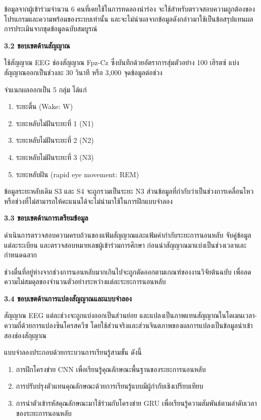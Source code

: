 \documentclass[12pt,a4paper]{article}
\newcommand{\subsectionthai}[1]{%
  \par\vspace{0.35\baselineskip}%
  \noindent\textbf{#1}\par\nobreak\vspace{0.1\baselineskip}%
}
\begin{document}
ข้อมูลจากผู้เข้าร่วมจำนวน 6 คนที่เคยใช้ในการทดลองนำร่อง จะใช้สำหรับตรวจสอบความถูกต้องของโปรแกรมและความพร้อมของระบบเท่านั้น และจะไม่นำผลจากข้อมูลดังกล่าวมาใช้เป็นข้อสรุปแทนผลการประเมินจากชุดข้อมูลฉบับสมบูรณ์

\subsectionthai{3.2 ขอบเขตด้านสัญญาณ}

ใช้สัญญาณ EEG ช่องสัญญาณ Fpz-Cz ซึ่งบันทึกด้วยอัตราการสุ่มตัวอย่าง 100 เฮิรตซ์ แบ่งสัญญาณออกเป็นช่วงละ 30 วินาที หรือ 3,000 จุดข้อมูลต่อช่วง

จำแนกผลออกเป็น 5 กลุ่ม ได้แก่

\begin{enumerate}[label=\arabic*.]
  \item ระยะตื่น (Wake: W)
  \item ระยะหลับไม่ฝันระยะที่ 1 (N1)
  \item ระยะหลับไม่ฝันระยะที่ 2 (N2)
  \item ระยะหลับไม่ฝันระยะที่ 3 (N3)
  \item ระยะหลับฝัน (rapid eye movement: REM)
\end{enumerate}

ข้อมูลระยะหลับเดิม S3 และ S4 จะถูกรวมเป็นระยะ N3 ส่วนข้อมูลที่กำกับว่าเป็นช่วงการเคลื่อนไหวหรือช่วงที่ไม่สามารถให้คะแนนได้จะไม่นำมาใช้ในการฝึกแบบจำลอง

\subsectionthai{3.3 ขอบเขตด้านการเตรียมข้อมูล}

ดำเนินการตรวจสอบความครบถ้วนของแฟ้มสัญญาณและแฟ้มคำกำกับระยะการนอนหลับ จับคู่ข้อมูลแต่ละระเบียน และตรวจสอบหมายเลขผู้เข้าร่วมการศึกษา ก่อนนำสัญญาณมาแบ่งเป็นช่วงเวลาและกำหนดฉลาก

ช่วงตื่นที่อยู่ห่างจากช่วงการนอนหลับมากเกินไปจะถูกตัดออกตามเกณฑ์ของงานวิจัยต้นฉบับ เพื่อลดความไม่สมดุลของจำนวนตัวอย่างระหว่างแต่ละระยะการนอนหลับ

\subsectionthai{3.4 ขอบเขตด้านการแปลงสัญญาณและแบบจำลอง}

สัญญาณ EEG แต่ละช่วงจะถูกแบ่งออกเป็นส่วนย่อย และแปลงเป็นภาพแทนสัญญาณในโดเมนเวลา-ความถี่ด้วยการแปลงซินโครสควีซ โดยใช้ส่วนจริงและส่วนจินตภาพของผลการแปลงเป็นข้อมูลนำเข้าสองช่องสัญญาณ

แบบจำลองประกอบด้วยกระบวนการเรียนรู้สามขั้น ดังนี้

\begin{enumerate}[label=\arabic*.]
  \item การฝึกโครงข่าย CNN เพื่อเรียนรู้คุณลักษณะพื้นฐานของระยะการนอนหลับ
  \item การปรับปรุงตัวแทนคุณลักษณะด้วยการเรียนรู้แบบมีผู้กำกับเชิงเปรียบเทียบ
  \item การนำตัวเข้ารหัสคุณลักษณะมาใช้ร่วมกับโครงข่าย GRU เพื่อเรียนรู้ความสัมพันธ์ตามลำดับเวลาของระยะการนอนหลับ
\end{enumerate}
\end{document}
